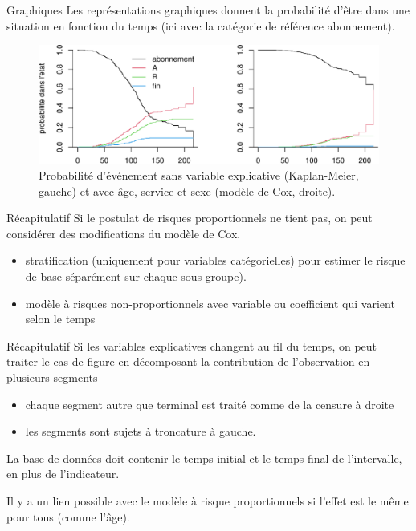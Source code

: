 \documentclass[
  ignorenonframetext,
]{beamer}
\providecommand{\tightlist}{%
  \setlength{\itemsep}{0pt}\setlength{\parskip}{0pt}}\usepackage{longtable,booktabs,array}
\begin{document}
\begin{frame}{Graphiques}
\protect\hypertarget{graphiques}{}
Les représentations graphiques donnent la probabilité d'être dans une
situation en fonction du temps (ici avec la catégorie de référence
abonnement).

\footnotesize

\begin{figure}

{\centering \includegraphics[width=1\textwidth,height=\textheight]{MATH60602-diapos10_files/figure-beamer/fig-competitif-1.pdf}

}

\caption{\label{fig-competitif}Probabilité d'événement sans variable
explicative (Kaplan-Meier, gauche) et avec âge, service et sexe (modèle
de Cox, droite).}

\end{figure}
\end{frame}

\begin{frame}{Récapitulatif}
\protect\hypertarget{ruxe9capitulatif}{}
Si le postulat de risques proportionnels ne tient pas, on peut
considérer des modifications du modèle de Cox.

\begin{itemize}
\tightlist
\item
  stratification (uniquement pour variables catégorielles) pour estimer
  le risque de base séparément sur chaque sous-groupe).
\item
  modèle à risques non-proportionnels avec variable ou coefficient qui
  varient selon le temps
\end{itemize}
\end{frame}

\begin{frame}{Récapitulatif}
\protect\hypertarget{ruxe9capitulatif-1}{}
Si les variables explicatives changent au fil du temps, on peut traiter
le cas de figure en décomposant la contribution de l'observation en
plusieurs segments

\begin{itemize}
\tightlist
\item
  chaque segment autre que terminal est traité comme de la censure à
  droite
\item
  les segments sont sujets à troncature à gauche.
\end{itemize}

La base de données doit contenir le temps initial et le temps final de
l'intervalle, en plus de l'indicateur.

Il y a un lien possible avec le modèle à risque proportionnels si
l'effet est le même pour tous (comme l'âge).
\end{frame}
\end{document}
